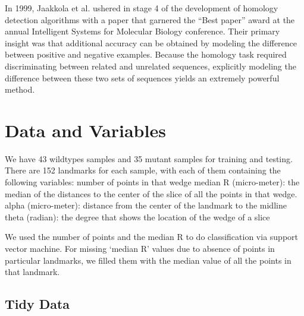 \documentclass[10pt,letterpaper]{article}
\begin{document}
In 1999, Jaakkola et al. ushered in stage 4 of the development of
homology detection algorithms with a paper that garnered the ``Best
paper'' award at the annual Intelligent Systems for Molecular Biology
conference. Their primary insight was that additional accuracy can be
obtained by modeling the difference between positive and negative
examples. Because the homology task required discriminating between
related and unrelated sequences, explicitly modeling the difference
between these two sets of sequences yields an extremely powerful method.

\section{Data and Variables}\label{data-and-variables}

We have 43 wildtypes samples and 35 mutant samples for training and
testing. There are 152 landmarks for each sample, with each of them
containing the following variables: number of points in that wedge
median R (micro-meter): the median of the distances to the center of the
slice of all the points in that wedge. alpha (micro-meter): distance
from the center of the landmark to the midline theta (radian): the
degree that shows the location of the wedge of a slice

We used the number of points and the median R to do classification via
support vector machine. For missing `median R' values due to absence of
points in particular landmarks, we filled them with the median value of
all the points in that landmark.

\subsection{Tidy Data}\label{tidy-data}
\end{document}

